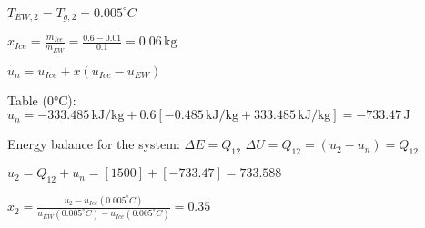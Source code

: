 \( T_{EW,2} = T_{g,2} = 0.005^\circ C \)  

\( x_{Ice} = \frac{m_{Ice}}{m_{EW}} = \frac{0.6 - 0.01}{0.1} = 0.06 \, \text{kg} \)  

\( u_n = u_{Ice} + x \left( u_{Ice} - u_{EW} \right) \)  

Table (0°C):  
\( u_n = -333.485 \, \text{kJ/kg} + 0.6 \left[ -0.485 \, \text{kJ/kg} + 333.485 \, \text{kJ/kg} \right] = -733.47 \, \text{J} \)  

Energy balance for the system:  
\( \Delta E = Q_{12} \)  
\( \Delta U = Q_{12} = \left( u_2 - u_n \right) = Q_{12} \)  

\( u_2 = Q_{12} + u_n = \left[ 1500 \right] + \left[ -733.47 \right] = 733.588 \)  

\( x_2 = \frac{u_2 - u_{Ice} \left( 0.005^\circ C \right)}{u_{EW} \left( 0.005^\circ C \right) - u_{Ice} \left( 0.005^\circ C \right)} = 0.35 \)